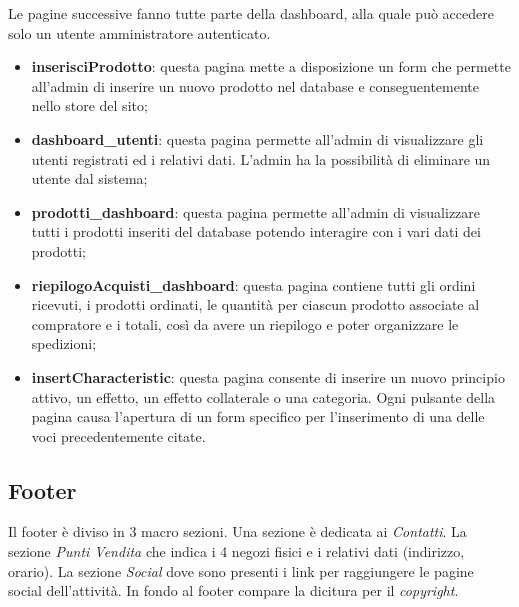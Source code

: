     Le pagine successive fanno tutte parte della dashboard, alla quale può accedere solo un utente amministratore autenticato.
\begin{itemize}
    \item \textbf{inserisciProdotto}: questa pagina mette a disposizione un form che permette all'admin di inserire un nuovo prodotto nel database e conseguentemente nello store del sito;
    \item \textbf{dashboard\_utenti}: questa pagina permette all'admin di visualizzare gli utenti registrati ed i relativi dati. L'admin ha la possibilità di eliminare un utente dal sistema;
    \item \textbf{prodotti\_dashboard}: questa pagina permette all'admin di visualizzare tutti i prodotti inseriti del database potendo interagire con i vari dati dei prodotti;
    \item \textbf{riepilogoAcquisti\_dashboard}: questa pagina contiene tutti gli ordini ricevuti, i prodotti ordinati, le quantità per ciascun prodotto associate al compratore e i totali, così da avere un riepilogo e poter organizzare le spedizioni;
    \item \textbf{insertCharacteristic}: questa pagina consente di inserire un nuovo principio attivo, un effetto, un effetto collaterale o una categoria. Ogni pulsante della pagina causa l'apertura di un form specifico per l'inserimento di una delle voci precedentemente citate.
\end{itemize}

\subsection{Footer}
Il footer è diviso in 3 macro sezioni.
Una sezione è dedicata ai \textit{Contatti}.
La sezione \textit{Punti Vendita} che indica i 4 negozi fisici e i relativi dati (indirizzo, orario).
La sezione \textit{Social} dove sono presenti i link per raggiungere le pagine social dell'attività.
In fondo al footer compare la dicitura per il \textit{copyright}.
